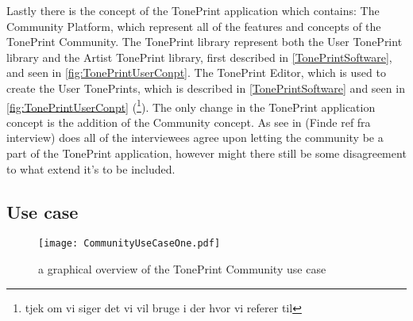 Lastly there is the concept of the TonePrint application which contains: The Community Platform, which represent all of the features and concepts of the TonePrint Community. The TonePrint library represent both the User TonePrint library and the Artist TonePrint library, first described in \autoref{TonePrintSoftware}, and seen in \autoref{fig:TonePrintUserConpt}. The TonePrint Editor, which is used to create the User TonePrints, which is described in \autoref{TonePrintSoftware} and seen in \autoref{fig:TonePrintUserConpt} (\footnote{tjek om vi siger det vi vil bruge i der hvor vi referer til}). The only change in the TonePrint application concept is the addition of the Community concept. As see in (Finde ref fra interview) does all of the interviewees agree upon letting the community be a part of the TonePrint application, however might there still be some disagreement to what extend it's to be included. 

\subsection{Use case}

\begin{figure}
	\centering
	\texttt{[image: CommunityUseCaseOne.pdf]}
	\caption{a graphical overview of the TonePrint Community use case}
	\label{fig:CommunityConceptualUseCase}
\end{figure}